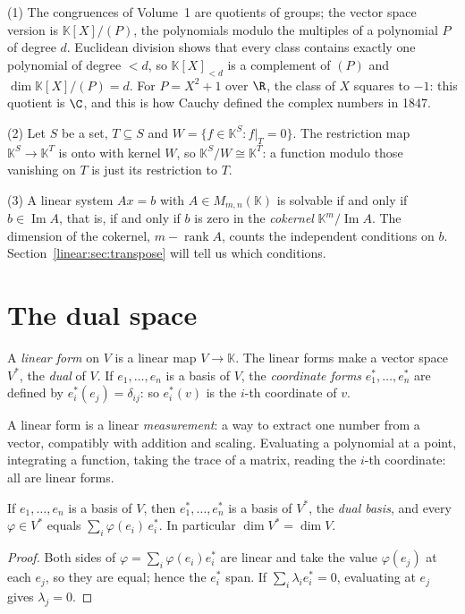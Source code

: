 \begin{example}\label{linear:ex:quotients}
(1) The congruences of Volume~1 are quotients of groups; the vector space version is $\mathbb K[X]/(P)$, the
polynomials modulo the multiples of a polynomial $P$ of degree $d$. Euclidean division shows that every class contains
exactly one polynomial of degree $<d$, so $\mathbb K[X]_{<d}$ is a complement of $(P)$ and $\dim\mathbb K[X]/(P)=d$.
For $P=X^2+1$ over $\R$, the class of $X$ squares to $-1$: this quotient is $\C$, and this is how Cauchy defined the
complex numbers in 1847.

(2) Let $S$ be a set, $T\subseteq S$ and $W=\{f\in\mathbb K^S:f|_T=0\}$. The restriction map $\mathbb K^S\to\mathbb K^T$
is onto with kernel $W$, so $\mathbb K^S/W\cong\mathbb K^T$: a function modulo those vanishing on $T$ is just its
restriction to $T$.

(3) A linear system $Ax=b$ with $A\in M_{m,n}(\mathbb K)$ is solvable if and only if $b\in\operatorname{Im}A$, that is,
if and only if $b$ is zero in the \emph{cokernel} $\mathbb K^m/\operatorname{Im}A$. The dimension of the cokernel,
$m-\operatorname{rank}A$, counts the independent conditions on $b$. Section~\ref{linear:sec:transpose} will tell us which
conditions.
\end{example}

\section{The dual space}

\begin{definition}\label{linear:def:dual}
A \emph{linear form} on $V$ is a linear map $V\to\mathbb K$. The linear forms make a vector space $V^*$, the \emph{dual}
of $V$. If $e_1,\dots,e_n$ is a basis of $V$, the \emph{coordinate forms} $e_1^*,\dots,e_n^*$ are defined by
$e_i^*(e_j)=\delta_{ij}$: so $e_i^*(v)$ is the $i$-th coordinate of $v$.
\end{definition}

A linear form is a linear \emph{measurement}: a way to extract one number from a vector, compatibly with addition and
scaling. Evaluating a polynomial at a point, integrating a function, taking the trace of a matrix, reading the $i$-th
coordinate: all are linear forms.

\begin{proposition}\label{linear:prop:dualbasis}
If $e_1,\dots,e_n$ is a basis of $V$, then $e_1^*,\dots,e_n^*$ is a basis of $V^*$, the \emph{dual basis}, and every
$\varphi\in V^*$ equals $\sum_i\varphi(e_i)\,e_i^*$. In particular $\dim V^*=\dim V$.
\end{proposition}
\begin{proof}
Both sides of $\varphi=\sum_i\varphi(e_i)e_i^*$ are linear and take the value $\varphi(e_j)$ at each $e_j$, so they are
equal; hence the $e_i^*$ span. If $\sum_i\lambda_ie_i^*=0$, evaluating at $e_j$ gives $\lambda_j=0$.
\end{proof}

